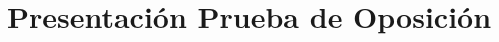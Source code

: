 \documentclass[9pt]{beamer}
\title{Presentación Prueba de Oposición}
\begin{document}
\begin{frame}
    \titlepage
\end{frame}
\end{document}
